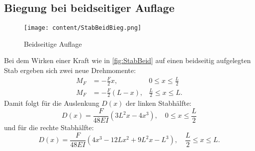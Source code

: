 \subsection{Biegung bei beidseitiger Auflage}
\label{subsec:BeidseitigeAuflage}
\begin{figure}[H]
    \centering
    \texttt{[image: content/StabBeidBieg.png]}
    \caption{Beidseitige Auflage}
    \label{fig:StabBeid}
\end{figure}
Bei dem Wirken einer Kraft wie in \autoref{fig:StabBeid} auf einen beidseitig aufgelegten Stab ergeben sich zwei neue Drehmomente:
\begin{align}
    M_F &= -\frac{F}{2}x, &0 \leq x \leq \frac{L}{2}\\
    M_F &= -\frac{F}{2}(L-x), &\frac{L}{2} \leq x \leq L.
\end{align}
Damit folgt für die Auslenkung $D(x)$ der linken Stabhälfte:
\begin{equation}
    D(x) = \frac{F}{48EI}\left(3L^2x-4x^3\right), \quad 0 \leq x \leq \frac{L}{2}
\end{equation}
und für die rechte Stabhälfte:
\begin{equation}
    D(x) = \frac{F}{48EI}\left(4x^3 - 12Lx^2 + 9L^2x - L^3\right), \quad \frac{L}{2} \leq x \leq L.
\end{equation}

